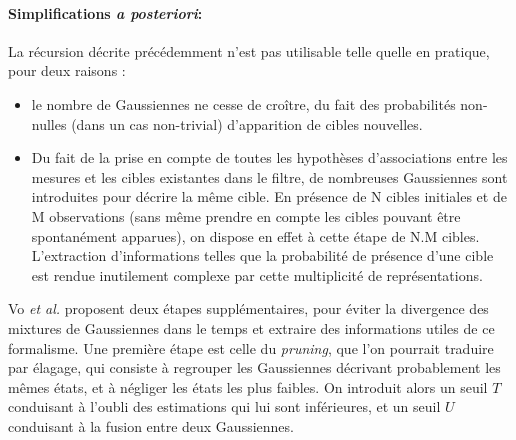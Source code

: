 \paragraph{Simplifications \emph{a posteriori}:\\}
La récursion décrite précédemment n'est pas utilisable telle quelle en pratique, pour deux raisons :
\begin{itemize}
	\item{le nombre de Gaussiennes ne cesse de croître, du fait des probabilités non-nulles (dans un cas non-trivial) d'apparition de cibles nouvelles.} \\
	
	\item{Du fait de la prise en compte de toutes les hypothèses d'associations entre les mesures et les cibles existantes dans le filtre, de nombreuses Gaussiennes sont introduites pour décrire la même cible. En présence de N cibles initiales et de M observations (sans même prendre en compte les cibles pouvant être spontanément apparues), on dispose en effet à cette étape de N.M \og cibles\fg{}. L'extraction d'informations telles que la probabilité de présence d'une cible est rendue inutilement complexe par cette multiplicité de représentations.\\}
\end{itemize}

Vo \textit{et al.} proposent deux étapes supplémentaires, pour éviter la divergence des mixtures de Gaussiennes dans le temps et extraire des informations utiles de ce formalisme. Une première étape est celle du \emph{pruning}, que l'on pourrait traduire par \og élagage\fg{}, qui consiste à regrouper les Gaussiennes décrivant probablement les mêmes états, et à négliger les états les plus faibles. On introduit alors un seuil $T$ conduisant à l'oubli des estimations qui lui sont inférieures, et un seuil $U$ conduisant à la fusion entre deux Gaussiennes.

